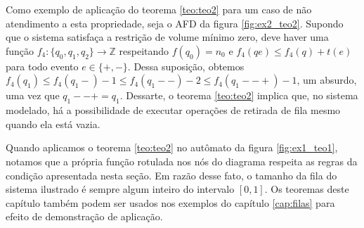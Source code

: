 Como exemplo de aplicação do teorema \ref{teo:teo2} para um caso de não atendimento a esta propriedade, seja o AFD da figura \ref{fig:ex2_teo2}. Supondo que o sistema satisfaça a restrição de volume mínimo zero, deve haver uma função $f_4 : \{ q_0, q_1, q_2 \} \to \mathbb{Z}$ respeitando $f(q_0) = n_0$ e $f_4(qe) \leq f_4(q) + t(e)$ para todo evento $e \in \{+, -\}$. Dessa suposição, obtemos $f_4(q_1) \leq f_4(q_1-) - 1 \leq f_4(q_1--) - 2 \leq f_4(q_1--+) - 1$, um absurdo, uma vez que $q_1--+ = q_1$. Dessarte, o teorema \ref{teo:teo2} implica que, no sistema modelado, há a possibilidade de executar operações de retirada de fila mesmo quando ela está vazia.


Quando aplicamos o teorema \ref{teo:teo2} no autômato da figura \ref{fig:ex1_teo1}, notamos que a própria função rotulada nos nós do diagrama respeita as regras da condição apresentada nesta seção. Em razão desse fato, o tamanho da fila do sistema ilustrado é sempre algum inteiro do intervalo $[0,1]$. Os teoremas deste capítulo também podem ser usados nos exemplos do capítulo \ref{cap:filas} para efeito de demonstração de aplicação.
